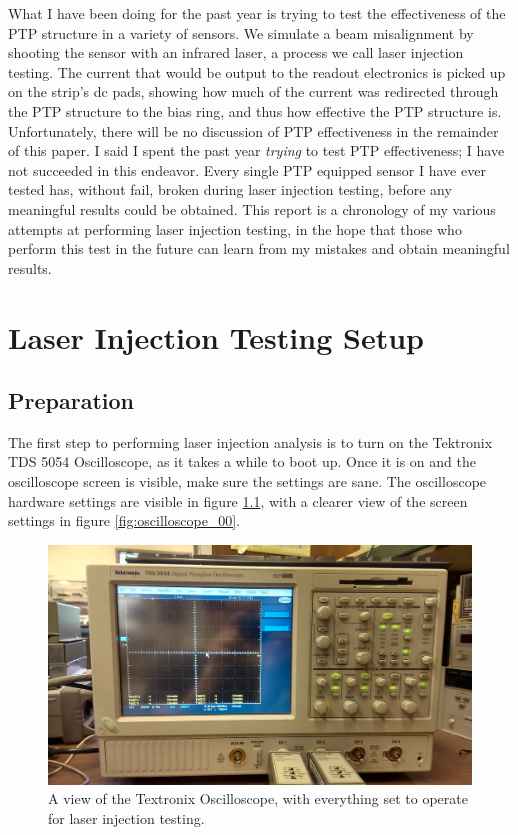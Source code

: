 \documentclass{report}
\begin{document}
        What I have been doing for the past year is trying to test the effectiveness of the PTP structure in a variety of sensors. We simulate a beam misalignment by shooting the sensor with an infrared laser, a process we call laser injection testing. The current that would be output to the readout electronics is picked up on the strip's dc pads, showing how much of the current was redirected through the PTP structure to the bias ring, and thus how effective the PTP structure is. Unfortunately, there will be no discussion of PTP effectiveness in the remainder of this paper. I said I spent the past year \textit{trying} to test PTP effectiveness; I have not succeeded in this endeavor. Every single PTP equipped sensor I have ever tested has, without fail, broken during laser injection testing, before any meaningful results could be obtained. This report is a chronology of my various attempts at performing laser injection testing, in the hope that those who perform this test in the future can learn from my mistakes and obtain meaningful results. 





    \chapter{ Laser Injection Testing Setup } \label{sect:methods}
        \section{ Preparation }
            The first step to performing laser injection analysis is to turn on the Tektronix TDS 5054 Oscilloscope, as it takes a while to boot up. Once it is on and the oscilloscope screen is visible, make sure the settings are sane. The oscilloscope hardware settings are visible in figure \ref{fig:oscilloscope_01}, with a clearer view of the screen settings in figure \ref{fig:oscilloscope_00}.

            \begin{figure}[h] 
                \includegraphics[height=.4\textheight]{oscilloscope_01}
                \centering
                \caption{ A view of the Textronix Oscilloscope, with everything set to operate for laser injection testing.}
                \label{fig:oscilloscope_01}
            \end{figure}
\end{document}
